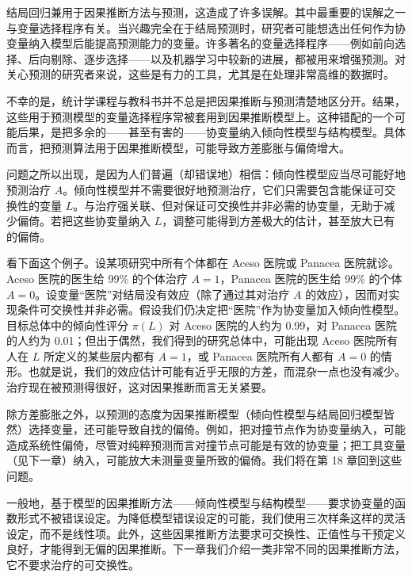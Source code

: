 结局回归兼用于因果推断方法与预测，这造成了许多误解。其中最重要的误解之一与变量选择程序有关。当兴趣完全在于结局预测时，研究者可能想选出任何作为协变量纳入模型后能提高预测能力的变量。许多著名的变量选择程序——例如前向选择、后向剔除、逐步选择——以及机器学习中较新的进展，都被用来增强预测。对关心预测的研究者来说，这些是有力的工具，尤其是在处理非常高维的数据时。

不幸的是，统计学课程与教科书并不总是把因果推断与预测清楚地区分开。结果，这些用于预测模型的变量选择程序常被套用到因果推断模型上。这种错配的一个可能后果，是把多余的——甚至有害的——协变量纳入倾向性模型与结构模型。具体而言，把预测算法用于因果推断模型，可能导致方差膨胀与偏倚增大。

问题之所以出现，是因为人们普遍（却错误地）相信：倾向性模型应当尽可能好地预测治疗 $A$。倾向性模型并不需要很好地预测治疗，它们只需要包含能保证可交换性的变量 $L$。与治疗强关联、但对保证可交换性并非必需的协变量，无助于减少偏倚。若把这些协变量纳入 $L$，调整可能得到方差极大的估计，甚至放大已有的偏倚。

看下面这个例子。设某项研究中所有个体都在 Aceso 医院或 Panacea 医院就诊。Aceso 医院的医生给 99\% 的个体治疗 $A=1$，Panacea 医院的医生给 99\% 的个体 $A=0$。设变量“医院”对结局没有效应（除了通过其对治疗 $A$ 的效应），因而对实现条件可交换性并非必需。假设我们仍决定把“医院”作为协变量加入倾向性模型。目标总体中的倾向性评分 $\pi(L)$ 对 Aceso 医院的人约为 0.99，对 Panacea 医院的人约为 0.01；但出于偶然，我们得到的研究总体中，可能出现 Aceso 医院所有人在 $L$ 所定义的某些层内都有 $A=1$，或 Panacea 医院所有人都有 $A=0$ 的情形。也就是说，我们的效应估计可能有近乎无限的方差，而混杂一点也没有减少。治疗现在被预测得很好，这对因果推断而言无关紧要。

除方差膨胀之外，以预测的态度为因果推断模型（倾向性模型与结局回归模型皆然）选择变量，还可能导致自找的偏倚。例如，把对撞节点作为协变量纳入，可能造成系统性偏倚，尽管对纯粹预测而言对撞节点可能是有效的协变量；把工具变量（见下一章）纳入，可能放大未测量变量所致的偏倚。我们将在第 18 章回到这些问题。

一般地，基于模型的因果推断方法——倾向性模型与结构模型——要求协变量的函数形式不被错误设定。为降低模型错误设定的可能，我们使用三次样条这样的灵活设定，而不是线性项。此外，这些因果推断方法要求可交换性、正值性与干预定义良好，才能得到无偏的因果推断。下一章我们介绍一类非常不同的因果推断方法，它不要求治疗的可交换性。
